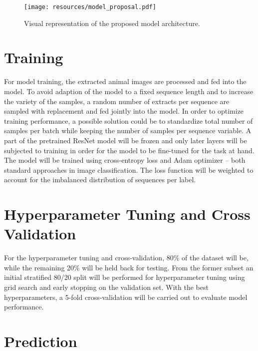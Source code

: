 \documentclass{article}
\begin{document}
\begin{figure}[ht]
  \centering
  \texttt{[image: resources/model\_proposal.pdf]}
  \caption{Visual representation of the proposed model architecture.}
  \label{fig:model}
\end{figure}

\section*{Training} %

For model training, the extracted animal images are processed and fed into the model. To avoid adaption of the model 
to a fixed sequence length and to increase the variety of the samples, a random number of extracts per sequence are 
sampled with replacement and fed jointly into the model. In order to optimize training performance, a possible
solution could be to standardize total number of samples per batch while keeping the number of samples per sequence
variable. A part of the pretrained ResNet model will be frozen and only later layers will be subjected
to training in order for the model to be fine-tuned for the task at hand. 
The model will be trained using cross-entropy loss and Adam optimizer -- both standard approaches 
in image classification. The loss function will be weighted to account for the imbalanced distribution of sequences
per label.

\section*{Hyperparameter Tuning and Cross Validation} %

For the hyperparameter tuning and cross-validation, 80\% of the dataset will be, while the remaining 20\% will be
held back for testing. From the former subset an initial stratified 80/20 split will be performed for hyperparameter 
tuning using grid search and early stopping on the validation set. With the best hyperparameters, 
a 5-fold cross-validation will be carried out to evaluate model performance.

\section*{Prediction} %
\end{document}
